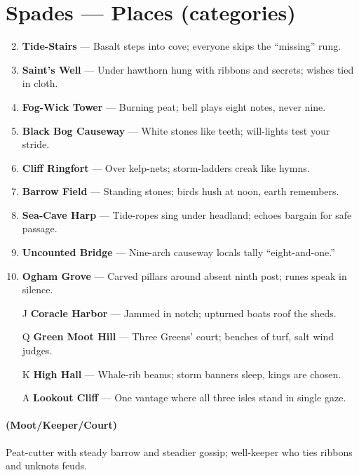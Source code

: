 \section*{Spades --- Places (categories)}
\label{sec:theona-places}
\begin{enumerate}
\setcounter{enumi}{1}
\item \textbf{Tide-Stairs} --- Basalt steps into cove; everyone skips the ``missing'' rung.
\item \textbf{Saint's Well} --- Under hawthorn hung with ribbons and secrets; wishes tied in cloth.
\item \textbf{Fog-Wick Tower} --- Burning peat; bell plays eight notes, never nine.
\item \textbf{Black Bog Causeway} --- White stones like teeth; will-lights test your stride.
\item \textbf{Cliff Ringfort} --- Over kelp-nets; storm-ladders creak like hymns.
\item \textbf{Barrow Field} --- Standing stones; birds hush at noon, earth remembers.
\item \textbf{Sea-Cave Harp} --- Tide-ropes sing under headland; echoes bargain for safe passage.
\item \textbf{Uncounted Bridge} --- Nine-arch causeway locals tally ``eight-and-one.''
\item \textbf{Ogham Grove} --- Carved pillars around absent ninth post; runes speak in silence.
\item[J] \textbf{Coracle Harbor} --- Jammed in notch; upturned boats roof the sheds.
\item[Q] \textbf{Green Moot Hill} --- Three Greens' court; benches of turf, salt wind judges.
\item[K] \textbf{High Hall} --- Whale-rib beams; storm banners sleep, kings are chosen.
\item[A] \textbf{Lookout Cliff} --- One vantage where all three isles stand in single gaze.
\end{enumerate}

\paragraph*{(Moot/Keeper/Court)} Peat-cutter with steady barrow and steadier gossip; well-keeper who ties ribbons and unknots feuds.

